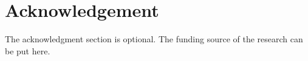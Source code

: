 \section{Acknowledgement}
\label{Ack}
The acknowledgment section is optional. The funding source of the research can be put here.

